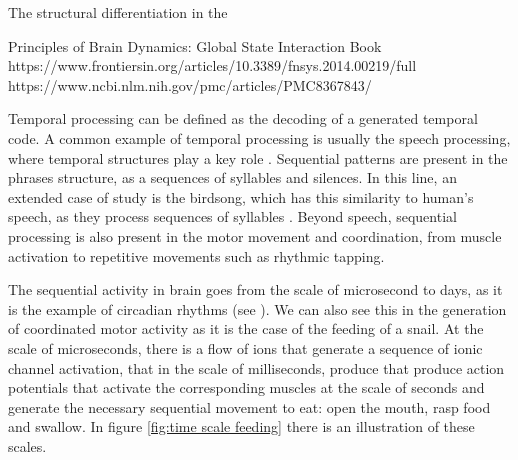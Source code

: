 The structural differentiation in the 




Principles of Brain Dynamics: Global State Interaction Book
https://www.frontiersin.org/articles/10.3389/fnsys.2014.00219/full
https://www.ncbi.nlm.nih.gov/pmc/articles/PMC8367843/





Temporal processing can be defined as the decoding of a generated temporal code. A common example of temporal processing is usually the speech processing, where temporal structures play a key role \parencite{bibid}. Sequential patterns are present in the phrases structure, as a sequences of syllables and silences. In this line, an extended case of study is the birdsong, which has this similarity to human's speech, as they process sequences of syllables \parencite{fishbein_sound_2019}. Beyond speech, sequential processing is also present in the motor movement and coordination, from muscle activation to repetitive movements such as rhythmic tapping.

The sequential activity in brain goes from the scale of microsecond to days, as it is the example of circadian rhythms (see \cite{mauk_neural_2004}). We can also see this in the generation of coordinated motor activity as it is the case of the feeding of a snail. At the scale of microseconds, there is a flow of ions that generate a sequence of ionic channel activation, that in the scale of milliseconds, produce that produce action potentials that activate the corresponding muscles at the scale of seconds  and generate the necessary sequential movement to eat: open the mouth, rasp food and swallow. In figure \ref{fig:time scale feeding} there is an illustration of these scales.



